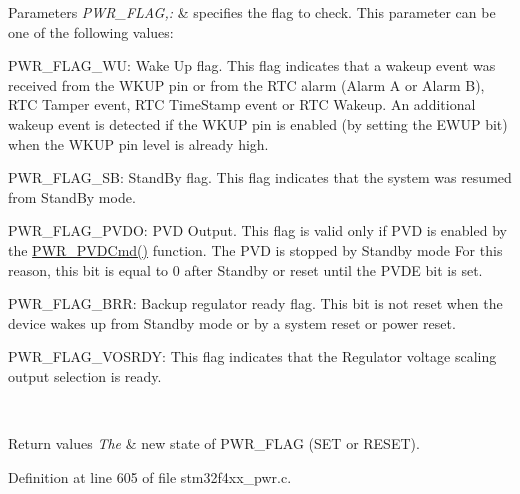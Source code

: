 \begin{DoxyParams}{Parameters}
{\em P\-W\-R\-\_\-\-F\-L\-A\-G,\-:} & specifies the flag to check. This parameter can be one of the following values\-: \begin{DoxyItemize}
\item P\-W\-R\-\_\-\-F\-L\-A\-G\-\_\-\-W\-U\-: Wake Up flag. This flag indicates that a wakeup event was received from the W\-K\-U\-P pin or from the R\-T\-C alarm (Alarm A or Alarm B), R\-T\-C Tamper event, R\-T\-C Time\-Stamp event or R\-T\-C Wakeup. An additional wakeup event is detected if the W\-K\-U\-P pin is enabled (by setting the E\-W\-U\-P bit) when the W\-K\-U\-P pin level is already high. \item P\-W\-R\-\_\-\-F\-L\-A\-G\-\_\-\-S\-B\-: Stand\-By flag. This flag indicates that the system was resumed from Stand\-By mode. \item P\-W\-R\-\_\-\-F\-L\-A\-G\-\_\-\-P\-V\-D\-O\-: P\-V\-D Output. This flag is valid only if P\-V\-D is enabled by the \hyperlink{group___p_w_r___exported___constants_ga42cad476b816e0a33594a933b3ed1acd}{P\-W\-R\-\_\-\-P\-V\-D\-Cmd()} function. The P\-V\-D is stopped by Standby mode For this reason, this bit is equal to 0 after Standby or reset until the P\-V\-D\-E bit is set. \item P\-W\-R\-\_\-\-F\-L\-A\-G\-\_\-\-B\-R\-R\-: Backup regulator ready flag. This bit is not reset when the device wakes up from Standby mode or by a system reset or power reset. \item P\-W\-R\-\_\-\-F\-L\-A\-G\-\_\-\-V\-O\-S\-R\-D\-Y\-: This flag indicates that the Regulator voltage scaling output selection is ready. \end{DoxyItemize}
\\
\hline
\end{DoxyParams}

\begin{DoxyRetVals}{Return values}
{\em The} & new state of P\-W\-R\-\_\-\-F\-L\-A\-G (S\-E\-T or R\-E\-S\-E\-T). \\
\hline
\end{DoxyRetVals}


Definition at line 605 of file stm32f4xx\-\_\-pwr.\-c.

